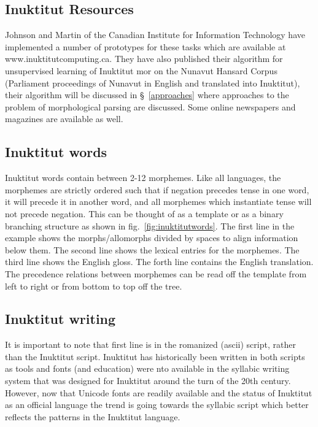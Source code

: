 \documentclass[runningheads,a4paper]{llncs}
\begin{document}
\subsection{Inuktitut Resources}

Johnson and Martin of the Canadian Institute for Information Technology have implemented a number of prototypes for these tasks which are available at www.inuktitutcomputing.ca. They have also published their algorithm for unsupervised learning of Inuktitut mor on the Nunavut Hansard Corpus (Parliament proceedings of Nunavut in English and translated into Inuktitut), their algorithm will be discussed in \S~\ref{approaches} where approaches to the problem of morphological parsing are discussed. Some online newspapers and magazines are available as well.

\subsection{Inuktitut words}

Inuktitut words contain between 2-12 morphemes. Like all languages, the morphemes are strictly ordered such that if negation precedes tense in one word, it will precede it in another word, and all morphemes which instantiate tense will not precede negation. This can be thought of as a template or as a binary branching structure as shown in fig.~\ref{fig:inuktitutwords}. The first line in the example shows the  morphs/allomorphs divided by spaces to align information below them. The second line shows the lexical entries for the morphemes. The third line shows the English gloss. The forth line contains the English translation. The precedence relations between morphemes can be read off the template from left to right or from bottom to top off the tree. 

\subsection{Inuktitut writing}

It is important to note that first line is in the romanized (ascii) script, rather than the Inuktitut script. Inuktitut has historically been written in both scripts as tools and fonts (and education) were nto available in the syllabic writing system that was designed for Inuktitut around the turn of the 20th century. However, now that Unicode fonts are readily available and the status of Inuktitut as an official language the trend is going towards the syllabic script which better reflects the patterns in the Inuktitut language.
\end{document}
